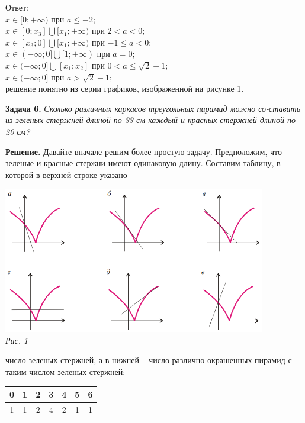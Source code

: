 \documentclass{article}
\begin{document}
\begin{multicols}{3}
Ответ:\\
$x \in [0;+\infty)$ при $a \leq -2;$ \\
$x \in [0;x_3]\bigcup[x_1;+\infty)$ при $2 < a < 0;$ \\
$x \in [x_3;0]\bigcup[x_1;+\infty)$ при $-1\leq a<0;$ \\
$x \in (-\infty;0]\bigcup[1;+\infty)$ при $a=0;$ \\
$x \in (-\infty;0]\bigcup[x_1;x_2]$ при $0 < a \leq \sqrt{2} - 1;$ \\
$x \in (-\infty;0]$ при $a > \sqrt{2} - 1;$ \\
решение понятно из серии графиков, изображенной на рисунке 1. \par
\textbf{Задача 6.} \textsl{Сколько различных каркасов
треугольных пирамид можно со-ставить из зеленых стержней
длиной по 33 см каждый и красных стержней длиной по 20 см?} \par
\textbf{Решение.}  Давайте вначале решим более
простую задачу. Предположим, что зеленые и красные
стержни имеют одинаковую длину. Составим таблицу,
в которой в верхней строке указано
\begin{minipage}{\linewidth}
\includegraphics[height=6.4cm]{images/picture1.png} \\
\textsl{Рис. 1} \\
\end{minipage}
число зеленых стержней, а в нижней –
число различно окрашенных пирамид с
таким числом зеленых стержней:
\begin{center}
\begin{tabular}{|c|c|c|c|c|c|c|} 
\hline
0 & 1 & 2 & 3 & 4 & 5 & 6 \\ 
\hline
1 & 1 & 2 & 4 & 2 & 1 & 1 \\
\hline
\end{tabular}
\end{center}

\end{multicols}
\end{document}
